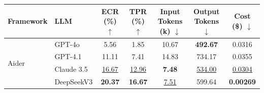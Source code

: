 \documentclass[letterpaper]{article} %
\renewcommand{\floatpagefraction}{0.2}
\begin{document}
\renewcommand{\floatpagefraction}{.15}
\renewcommand{\textfraction}{.1}
\begin{table}[!t]
\centering
\small
\renewcommand{\arraystretch}{1.1}
\begin{tabular}{llccccc}
\toprule
\textbf{Framework} & \textbf{LLM} & 
\textbf{ECR (\%) $\uparrow$} & 
\textbf{TPR (\%) $\uparrow$} & 
\textbf{Input Tokens (k) $\downarrow$} & 
\textbf{Output Tokens $\downarrow$} & 
\textbf{Cost (\$) $\downarrow$} \\
\midrule
\multirow{4}{*}{Aider}
& \cellcolor{gray!4}GPT-4o       & \cellcolor{gray!4}5.56         & 
\cellcolor{gray!4}1.85         & 
\cellcolor{gray!4}10.67        & \cellcolor{gray!4}\textbf{492.67}     & \cellcolor{gray!4}0.0316            \\
& \cellcolor{gray!8}GPT-4.1      & \cellcolor{gray!8}11.11        & \cellcolor{gray!8}7.41         & \cellcolor{gray!8}14.83        & \cellcolor{gray!8}734.17             & \cellcolor{gray!8}0.0355           \\
& \cellcolor{gray!12}Claude 3.5    & \cellcolor{gray!12}\underline{16.67}        & \cellcolor{gray!12}\underline{12.96}        & \cellcolor{gray!12}\textbf{7.48} & \cellcolor{gray!12}\underline{534.00}  & \cellcolor{gray!12}\underline{0.0304} \\
& \cellcolor{gray!12}DeepSeekV3   & \cellcolor{gray!12}\textbf{20.37}        & \cellcolor{gray!12}\textbf{16.67}        & \cellcolor{gray!12}\underline{7.51} & 
\cellcolor{gray!12}599.64         & \cellcolor{gray!12}\textbf{0.00269} \\


\end{tabular}
\end{table}
\end{document}
